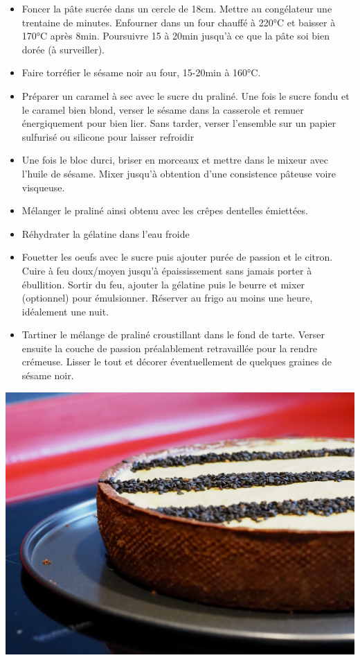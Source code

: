 \documentclass[]{book}
\providecommand{\tightlist}{%
  \setlength{\itemsep}{0pt}\setlength{\parskip}{0pt}}
\begin{document}
\begin{itemize}
\tightlist
\item
  Foncer la pâte sucrée dans un cercle de 18cm. Mettre au congélateur
  une trentaine de minutes. Enfourner dans un four chauffé à 220°C et
  baisser à 170°C après 8min. Poursuivre 15 à 20min jusqu'à ce que la
  pâte soi bien dorée (à surveiller).
\item
  Faire torréfier le sésame noir au four, 15-20min à 160°C.
\item
  Préparer un caramel à sec avec le sucre du praliné. Une fois le sucre
  fondu et le caramel bien blond, verser le sésame dans la casserole et
  remuer énergiquement pour bien lier. Sans tarder, verser l'ensemble
  sur un papier sulfurisé ou silicone pour laisser refroidir
\item
  Une fois le bloc durci, briser en morceaux et mettre dans le mixeur
  avec l'huile de sésame. Mixer jusqu'à obtention d'une consistence
  pâteuse voire visqueuse.
\item
  Mélanger le praliné ainsi obtenu avec les crêpes dentelles émiettées.
\item
  Réhydrater la gélatine dans l'eau froide
\item
  Fouetter les oeufs avec le sucre puis ajouter purée de passion et le
  citron. Cuire à feu doux/moyen jusqu'à épaississement sans jamais
  porter à ébullition. Sortir du feu, ajouter la gélatine puis le beurre
  et mixer (optionnel) pour émulsionner. Réserver au frigo au moins une
  heure, idéalement une nuit.
\item
  Tartiner le mélange de praliné croustillant dans le fond de tarte.
  Verser ensuite la couche de passion préalablement retravaillée pour la
  rendre crémeuse. Lisser le tout et décorer éventuellement de quelques
  graines de sésame noir.
\end{itemize}

\begin{center}\includegraphics[width=0.9\linewidth]{photos/pralinesesame_passion1} \end{center}
\end{document}
